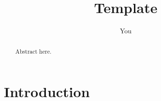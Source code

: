 \documentclass{article}
\title{Template}
\author{You}
\newcommand{\beginsupplement}{%
        \setcounter{table}{0}
        \renewcommand{\thetable}{S\arabic{table}}%
        \setcounter{figure}{0}
        \renewcommand{\thefigure}{S\arabic{figure}}%
     }
\begin{document}
\maketitle

\begin{abstract}
Abstract here.
\end{abstract}


\section*{Introduction}
\cite{Felsenstein1981-zs}







\end{document}

